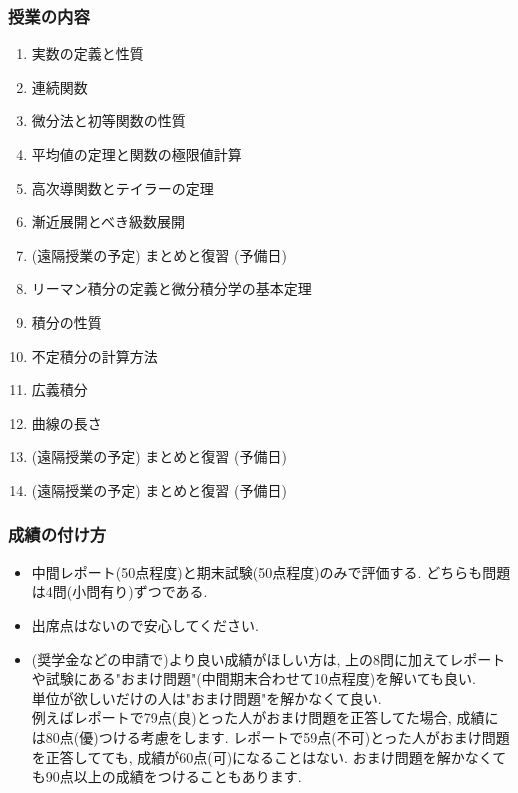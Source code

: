 \documentclass[11pt,dvipdfmx]{beamer}
\theoremstyle{definition}
\theoremstyle{remark}
\begin{document}
\begin{frame}
\frametitle{授業の内容}
\begin{enumerate}
\item 実数の定義と性質
\item 連続関数
\item 微分法と初等関数の性質
\item 平均値の定理と関数の極限値計算
\item 高次導関数とテイラーの定理
\item 漸近展開とべき級数展開
\item (遠隔授業の予定) まとめと復習 (予備日)
\item リーマン積分の定義と微分積分学の基本定理
\item 積分の性質 
\item 不定積分の計算方法
\item 広義積分
\item 曲線の長さ
\item (遠隔授業の予定) まとめと復習 (予備日)
\item (遠隔授業の予定) まとめと復習 (予備日)
\end{enumerate}


\end{frame}

\begin{frame}
\frametitle{成績の付け方}
 \begin{itemize}
 \item 中間レポート(50点程度)と期末試験(50点程度)のみで評価する. 
 どちらも問題は4問(小問有り)ずつである.
 \item 出席点はないので安心してください.
 \item (奨学金などの申請で)より良い成績がほしい方は, 上の8問に加えてレポートや試験にある"おまけ問題"(中間期末合わせて10点程度)を解いても良い. \\
 単位が欲しいだけの人は"おまけ問題"を解かなくて良い. \\
 {\tiny 例えばレポートで79点(良)とった人がおまけ問題を正答してた場合, 成績には80点(優)つける考慮をします.
 レポートで59点(不可)とった人がおまけ問題を正答してても, 成績が60点(可)になることはない. }
{\tiny  おまけ問題を解かなくても90点以上の成績をつけることもあります.}
 \end{itemize}


\end{frame}
\end{document}
